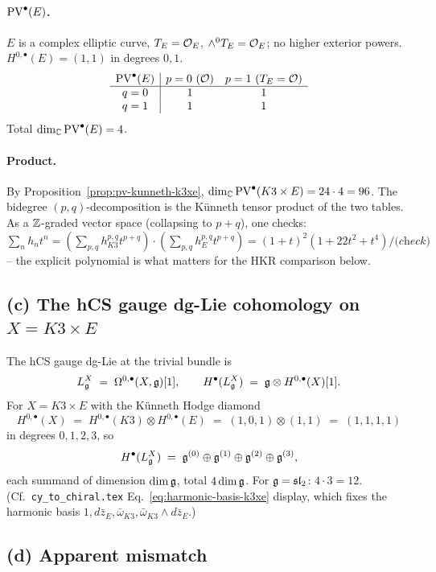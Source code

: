 \paragraph{$\mathrm{PV}^\bullet(E)$.}
$E$ is a complex elliptic curve, $T_E = \mathcal{O}_E$, $\wedge^0 T_E = \mathcal{O}_E$;
no higher exterior powers. $H^{0,\bullet}(E) = (1, 1)$ in degrees $0, 1$.
\[
\begin{array}{c|cc}
 \mathrm{PV}^\bullet(E) & p=0\ (\mathcal{O}) & p=1\ (T_E=\mathcal{O}) \\\hline
 q=0 & 1 & 1 \\
 q=1 & 1 & 1
\end{array}
\]
Total $\dim_{\mathbb{C}}\mathrm{PV}^\bullet(E) = 4$.

\paragraph{Product.}
By Proposition~\ref{prop:pv-kunneth-k3xe},
$\dim_{\mathbb{C}}\mathrm{PV}^\bullet(K3\times E) = 24\cdot 4 = 96$. The bidegree
$(p,q)$-decomposition is the K\"unneth tensor product of the two
tables. As a $\mathbb{Z}$-graded vector space (collapsing to $p+q$), one
checks: $\sum_n h_n t^n = (\sum_{p,q} h^{p,q}_{K3}t^{p+q})\cdot
(\sum_{p,q}h^{p,q}_E t^{p+q}) = (1+t)^2(1+22t^2+t^4) /
\textit{(check)}$ -- the explicit polynomial is what matters for the
HKR comparison below.

\subsection*{(c) The hCS gauge dg-Lie cohomology on $X = K3\times E$}

The hCS gauge dg-Lie at the trivial bundle is
\[
 L_{\mathfrak{g}}^X \;=\; \Omega^{0,\bullet}(X, \mathfrak{g})[1],
 \qquad H^\bullet(L_{\mathfrak{g}}^X) \;=\; \mathfrak{g}\otimes H^{0,\bullet}(X)[1].
\]
For $X = K3\times E$ with the K\"unneth Hodge diamond
\[
 H^{0,\bullet}(X) \;=\;
 H^{0,\bullet}(K3)\otimes H^{0,\bullet}(E)
 \;=\; (1,0,1)\otimes(1,1) \;=\; (1,1,1,1)
\]
in degrees $0,1,2,3$, so
\[
 H^\bullet(L_{\mathfrak{g}}^X)
 \;=\;
 \mathfrak{g}^{(0)}\oplus\mathfrak{g}^{(1)}\oplus\mathfrak{g}^{(2)}\oplus\mathfrak{g}^{(3)},
\]
each summand of dimension $\dim\mathfrak{g}$, total $4\dim\mathfrak{g}$.
For $\mathfrak{g} = \mathfrak{sl}_2$: $4\cdot 3 = 12$. (Cf.\
\texttt{cy\_to\_chiral.tex} Eq.~\eqref{eq:harmonic-basis-k3xe}
display, which fixes the harmonic basis
$1, d\bar z_E, \bar\omega_{K3}, \bar\omega_{K3}\wedge d\bar z_E$.)

\subsection*{(d) Apparent mismatch}

